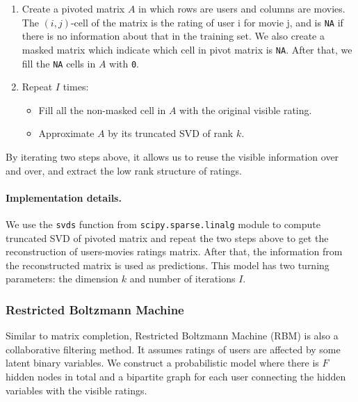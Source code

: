 \documentclass[bj, preprint]{imsart}
\begin{document}
\begin{enumerate}
\item Create a pivoted matrix $A$ in which rows are users and columns are movies. The $(i,j)$-cell of the matrix is the rating of user i for movie j, and is \texttt{NA} if there is no information about that in the training set. We also create a masked matrix which indicate which cell in pivot matrix is \texttt{NA}. After that, we fill the \texttt{NA} cells in $A$ with \texttt{0}.
\item Repeat $I$ times: 
\begin{itemize}
	\item Fill all the non-masked cell in $A$ with the original visible rating.
	\item Approximate $A$ by its truncated SVD of rank $k$. 
\end{itemize}
\end{enumerate}

By iterating two steps above, it allows us to reuse the visible information over and over, and extract the low rank structure of ratings. 




\paragraph{Implementation details.}\label{par:method.models.svd.impl}
We use the \texttt{svds} function from \texttt{scipy.sparse.linalg} module \citep{2020SciPy-NMeth} to compute truncated SVD of pivoted matrix and repeat the two steps above to get the reconstruction of users-movies ratings matrix. After that, the information from the reconstructed matrix is used as predictions. This model has two turning parameters: the dimension $k$ and number of iterations $I$.  


\subsubsection{Restricted Boltzmann Machine}\label{subsubsec:method.models.rbm}
Similar to matrix completion, Restricted Boltzmann Machine (RBM) is also a collaborative filtering method. It assumes ratings of users are affected by some latent binary variables. We construct a probabilistic model where there is $F$ hidden nodes in total and a bipartite graph for each user connecting the hidden variables with the visible ratings. 
\end{document}

